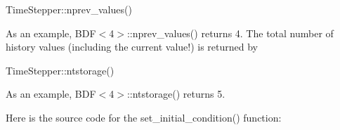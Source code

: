 \begin{center}
\begin{longtabu}
\begin{DoxyCode}
TimeStepper::nprev\_values()
\end{DoxyCode}


As an example, {\ttfamily B\+D\+F$<$4$>$\+::nprev\+\_\+values()} returns 4. The total number of history values (including the current value!) is returned by


\begin{DoxyCode}
TimeStepper::ntstorage()
\end{DoxyCode}


As an example, {\ttfamily B\+D\+F$<$4$>$\+::ntstorage()} returns 5.   \\
\end{longtabu}
\end{center} 

Here is the source code for the {\ttfamily set\+\_\+initial\+\_\+condition()} function\+: 

